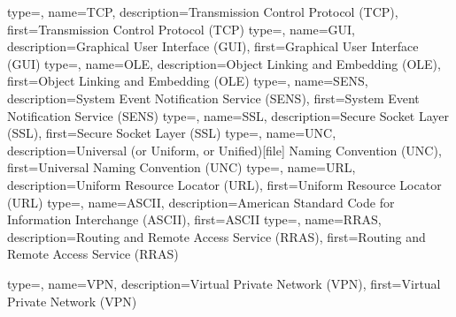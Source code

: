 {
  type=\acronymtype,
  name=TCP,
  description={Transmission Control Protocol (TCP)},
  first={Transmission Control Protocol (TCP)}
}
{
  type=\acronymtype,
  name=GUI,
  description={Graphical User Interface (GUI)},
  first={Graphical User Interface (GUI)}
}
{
  type=\acronymtype,
  name=OLE,
  description={Object Linking and Embedding (OLE)},
  first={Object Linking and Embedding (OLE)}
}
{
  type=\acronymtype,
  name=SENS,
  description={System Event Notification Service (SENS)},
  first={System Event Notification Service (SENS)}
}
{
  type=\acronymtype,
  name=SSL,
  description={Secure Socket Layer (SSL)},
  first={Secure Socket Layer (SSL)}
}
{
  type=\acronymtype,
  name=UNC,
  description={Universal (or Uniform, or Unified)[file] Naming Convention (UNC)},
  first={Universal Naming Convention (UNC)}
}
{
  type=\acronymtype,
  name=URL,
  description={Uniform Resource Locator (URL)},
  first={Uniform Resource Locator (URL)}
}
{
  type=\acronymtype,
  name=ASCII,
  description={American Standard Code for Information Interchange (ASCII)},
  first={ASCII}
}
{
  type=\acronymtype,
  name=RRAS,
  description={Routing and Remote Access Service (RRAS)},
  first={Routing and Remote Access Service (RRAS)}
}

{
  type=\acronymtype,
  name=VPN,
  description={Virtual Private Network (VPN)},
  first={Virtual Private Network (VPN)}
}


